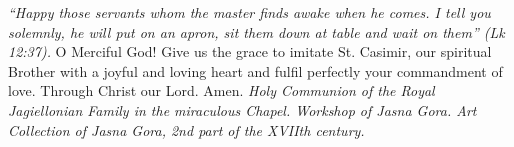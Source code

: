 \pagestyle{empty}
\hspace{0pt}
\vfill

\textit{``Happy those servants whom the master finds awake
when he comes. I tell you solemnly, he will put on an apron, sit
them down at table and wait on them'' (Lk 12:37).}
\medbreak
O Merciful God! Give us the grace to imitate St. Casimir,
our spiritual Brother with a joyful and loving heart and fulfil perfectly your commandment of love. Through Christ our Lord.
Amen.
\vfill
\textit{Holy Communion of the Royal Jagiellonian Family in the miraculous Chapel.
Workshop of Jasna Gora. Art Collection of Jasna Gora,
2nd part of the XVIIth century.}
\hspace{0pt}
\newpage
